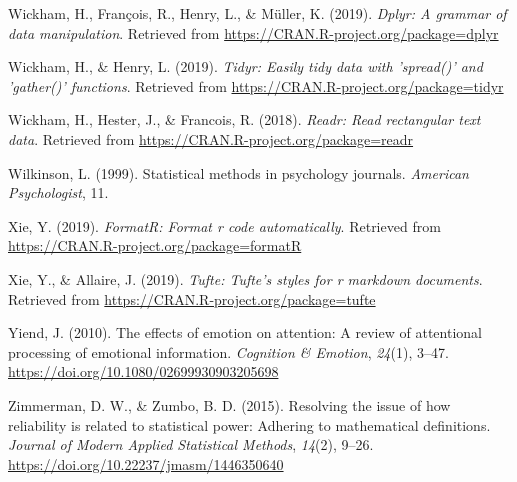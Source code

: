\documentclass[english,,man,floatsintext]{apa6}
\begin{document}
\leavevmode\hypertarget{ref-R-dplyr}{}%
Wickham, H., François, R., Henry, L., \& Müller, K. (2019). \emph{Dplyr: A grammar of data manipulation}. Retrieved from \url{https://CRAN.R-project.org/package=dplyr}

\leavevmode\hypertarget{ref-R-tidyr}{}%
Wickham, H., \& Henry, L. (2019). \emph{Tidyr: Easily tidy data with 'spread()' and 'gather()' functions}. Retrieved from \url{https://CRAN.R-project.org/package=tidyr}

\leavevmode\hypertarget{ref-R-readr}{}%
Wickham, H., Hester, J., \& Francois, R. (2018). \emph{Readr: Read rectangular text data}. Retrieved from \url{https://CRAN.R-project.org/package=readr}

\leavevmode\hypertarget{ref-wilkinson_statistical_1999}{}%
Wilkinson, L. (1999). Statistical methods in psychology journals. \emph{American Psychologist}, 11.

\leavevmode\hypertarget{ref-R-formatR}{}%
Xie, Y. (2019). \emph{FormatR: Format r code automatically}. Retrieved from \url{https://CRAN.R-project.org/package=formatR}

\leavevmode\hypertarget{ref-R-tufte}{}%
Xie, Y., \& Allaire, J. (2019). \emph{Tufte: Tufte's styles for r markdown documents}. Retrieved from \url{https://CRAN.R-project.org/package=tufte}

\leavevmode\hypertarget{ref-yiend_effects_2010}{}%
Yiend, J. (2010). The effects of emotion on attention: A review of attentional processing of emotional information. \emph{Cognition \& Emotion}, \emph{24}(1), 3--47. \url{https://doi.org/10.1080/02699930903205698}

\leavevmode\hypertarget{ref-zimmerman_resolving_2015}{}%
Zimmerman, D. W., \& Zumbo, B. D. (2015). Resolving the issue of how reliability is related to statistical power: Adhering to mathematical definitions. \emph{Journal of Modern Applied Statistical Methods}, \emph{14}(2), 9--26. \url{https://doi.org/10.22237/jmasm/1446350640}
\end{document}

